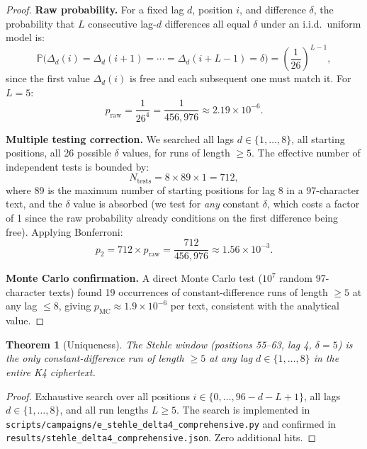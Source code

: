 \documentclass[11pt]{article}
\theoremstyle{plain}
\newtheorem{theorem}{Theorem}[section]
\theoremstyle{definition}
\theoremstyle{remark}
\newcommand{\Prob}{\mathbb{P}}
\begin{document}
\begin{proof}
\textbf{Raw probability.} For a fixed lag $d$, position $i$, and difference $\delta$, the probability that $L$ consecutive lag-$d$ differences all equal $\delta$ under an i.i.d.\ uniform model is:
\begin{equation}
\Prob\bigl(\Delta_d(i) = \Delta_d(i{+}1) = \cdots = \Delta_d(i{+}L{-}1) = \delta\bigr) = \left(\frac{1}{26}\right)^{L-1},
\end{equation}
since the first value $\Delta_d(i)$ is free and each subsequent one must match it. For $L = 5$:
\begin{equation}
p_{\text{raw}} = \frac{1}{26^4} = \frac{1}{456{,}976} \approx 2.19 \times 10^{-6}.
\end{equation}

\textbf{Multiple testing correction.} We searched all lags $d \in \{1,\ldots,8\}$, all starting positions, all 26 possible $\delta$ values, for runs of length $\geq 5$. The effective number of independent tests is bounded by:
\[
N_{\text{tests}} = 8 \times 89 \times 1 = 712,
\]
where 89 is the maximum number of starting positions for lag 8 in a 97-character text, and the $\delta$ value is absorbed (we test for \emph{any} constant $\delta$, which costs a factor of 1 since the raw probability already conditions on the first difference being free). Applying Bonferroni:
\begin{equation}
p_2 = 712 \times p_{\text{raw}} = \frac{712}{456{,}976} \approx 1.56 \times 10^{-3}.
\end{equation}

\textbf{Monte Carlo confirmation.} A direct Monte Carlo test ($10^7$ random 97-character texts) found 19 occurrences of constant-difference runs of length $\geq 5$ at any lag $\leq 8$, giving $p_{\text{MC}} \approx 1.9 \times 10^{-6}$ per text, consistent with the analytical value.
\end{proof}

\begin{theorem}[Uniqueness]
\label{thm:stehle-unique}
The Stehle window (positions 55--63, lag 4, $\delta=5$) is the \emph{only} constant-difference run of length $\geq 5$ at any lag $d \in \{1,\ldots,8\}$ in the entire K4 ciphertext.
\end{theorem}

\begin{proof}
Exhaustive search over all positions $i \in \{0,\ldots,96-d-L+1\}$, all lags $d \in \{1,\ldots,8\}$, and all run lengths $L \geq 5$. The search is implemented in \texttt{scripts/campaigns/e\_stehle\_delta4\_comprehensive.py} and confirmed in \texttt{results/stehle\_delta4\_comprehensive.json}. Zero additional hits.
\end{proof}
\end{document}
